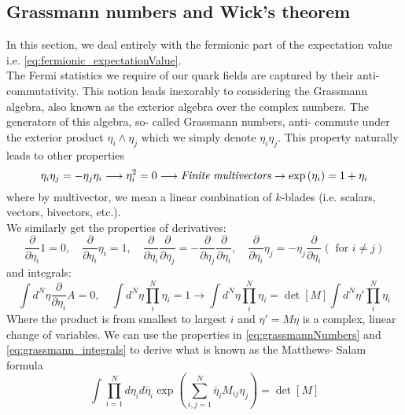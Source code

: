 \documentclass[a4paper,10pt]{book}
\begin{document}
\subsection{Grassmann numbers and Wick's theorem}
In this section, we deal entirely with the fermionic part of the expectation value i.e. \eqref{eq:fermionic_expectationValue}.\\The Fermi statistics we require of our quark fields are captured by their anti- commutativity. This notion leads inexorably to considering the Grassmann algebra, also known as the exterior algebra over the complex numbers. The generators of this algebra, so- called Grassmann numbers, anti- commute under the exterior product $\eta_i\wedge\eta_j$ which we simply denote $\eta_i\eta_j$. This property naturally leads to other properties
\begin{equation}\label{eq:grassmannNumbers}
\eta_i\eta_j = -\eta_j\eta_i \longrightarrow \eta_i^2 = 0 \longrightarrow \mathit{Finite  }\hspace{1mm}\mathit{multivectors} \rightarrow \exp\left( \eta_i \right) = 1+\eta_i
\end{equation}
where by multivector, we mean a linear combination of $k$-blades (i.e. scalars, vectors, bivectors, etc.).\\We similarly get the properties of derivatives:
\begin{equation}
\frac{\partial}{\partial \eta_{i}} 1=0, \quad \frac{\partial}{\partial \eta_{i}} \eta_{i}=1, \quad \frac{\partial}{\partial \eta_{i}} \frac{\partial}{\partial \eta_{j}}=-\frac{\partial}{\partial \eta_{j}} \frac{\partial}{\partial \eta_{i}}, \quad \frac{\partial}{\partial \eta_{i}} \eta_{j}=-\eta_{j} \frac{\partial}{\partial \eta_{i}}(\text { for } i \neq j)
\end{equation}
and integrals:
\begin{equation}\label{eq:grassmann_integrals}
\int d^N\eta\frac{\partial}{\partial \eta_i}A = 0, \quad \int d^N\eta \prod\limits_{i}^N\eta_i = 1 \longrightarrow \int d^N\eta \prod\limits_{i}^N\eta_i = \operatorname{det}\left[ M \right]\int d^N\eta' \prod\limits_{i}^N\eta_i
\end{equation}
Where the product is from smallest to largest $i$ and $\eta' = M\eta$ is a complex, linear change of variables. We can use the properties in \eqref{eq:grassmannNumbers} and \eqref{eq:grassmann_integrals} to derive what is known as the Matthews- Salam formula \cite{AIHPA_1979__30_3_193_0}
\begin{equation}\label{eq:Matthews_salam}
\int \prod\limits_{i=1}^Nd\eta_id\bar{\eta}_i \exp\left( \sum\limits_{i,j=1}^N \bar{\eta}_iM_{ij}\eta_j\right) = \operatorname{det}\left[ M \right]
\end{equation}
\end{document}
